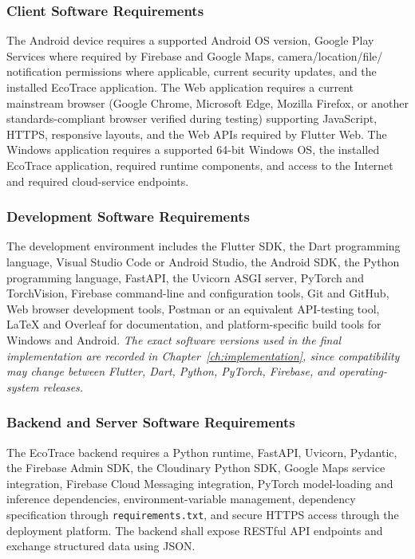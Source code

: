 \subsubsection{Client Software Requirements}
The Android device requires a supported Android OS version, Google Play
Services where required by Firebase and Google Maps, camera/location/file/
notification permissions where applicable, current security updates, and the
installed EcoTrace application. The Web application requires a current
mainstream browser (Google Chrome, Microsoft Edge, Mozilla Firefox, or
another standards-compliant browser verified during testing) supporting
JavaScript, HTTPS, responsive layouts, and the Web APIs required by Flutter
Web. The Windows application requires a supported 64-bit Windows OS, the
installed EcoTrace application, required runtime components, and access to
the Internet and required cloud-service endpoints.

\subsubsection{Development Software Requirements}
The development environment includes the Flutter SDK, the Dart
programming language, Visual Studio Code or Android Studio, the Android
SDK, the Python programming language, FastAPI, the Uvicorn ASGI server,
PyTorch and TorchVision, Firebase command-line and configuration tools,
Git and GitHub, Web browser development tools, Postman or an equivalent
API-testing tool, LaTeX and Overleaf for documentation, and platform-specific
build tools for Windows and Android. \textit{The exact software versions used
in the final implementation are recorded in Chapter~\ref{ch:implementation},
since compatibility may change between Flutter, Dart, Python, PyTorch,
Firebase, and operating-system releases.}

\subsubsection{Backend and Server Software Requirements}
The EcoTrace backend requires a Python runtime, FastAPI, Uvicorn,
Pydantic, the Firebase Admin SDK, the Cloudinary Python SDK, Google Maps
service integration, Firebase Cloud Messaging integration, PyTorch
model-loading and inference dependencies, environment-variable
management, dependency specification through \texttt{requirements.txt}, and
secure HTTPS access through the deployment platform. The backend shall
expose RESTful API endpoints and exchange structured data using JSON.

